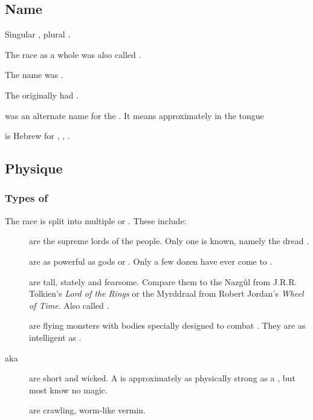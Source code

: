 \subsection{Name}
Singular \emph{\bane{}}, plural \emph{\banes{}}. 

The \bane{} race as a whole was also called . 

The name \quo{\bane} was . 

The \dragons originally had . 

\emph{\SitraAchras} was an alternate \resphan name for the \banes. 
It means approximately  in the \Resphan tongue 

\emph{\SitraAchra} is Hebrew for , , . 









\subsection{Physique}





\subsubsection{Types of \banes}
The \SitraAchra race is split into multiple  or . 
These include: 

\begin{description}
  \item[\Banekings] are the supreme lords of the \bane{} people. 
    Only one \baneking{} is known, namely the dread . 
  \item[\Banelords] are as powerful as gods or \dragons. 
    Only a few dozen \banelords{} have ever come to \Miith{}. 
  \item[\Greaterbanes] are tall, stately and fearsome. 
    Compare them to the Nazg\^ul from J.R.R. Tolkien's \emph{Lord of the Rings} or the Myrddraal from Robert Jordan's \emph{Wheel of Time}. 
    Also called \quo{\baneknights}. 
  \item[\Screamers] are flying monsters with bodies specially designed to combat \dragons.
    They are as intelligent as \lesserbanes. 
  \item[\Lesserbanes aka \stalkers] are short and wicked. 
    A \lesserbane{} is approximately as physically strong as a \resphan, but most \lesserbanes{} know no magic. 
  \item[\Banespawns] are crawling, worm-like vermin. 
\end{description}





